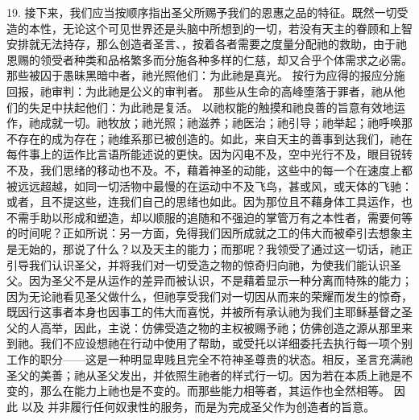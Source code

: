 19. 接下来，我们应当按顺序指出圣父所赐予我们的恩惠之品的特征。既然一切受造的本性，无论这个可见世界还是头脑中所想到的一切，若没有天主的眷顾和上智安排就无法持存，那么创造者圣言、，按着各者需要之度量分配祂的救助，由于祂恩赐的领受者种类和品格繁多而分施各种多样的仁慈，却又合乎个体需求之必需。那些被囚于愚昧黑暗中者，祂光照他们：为此祂是真光。 按行为应得的报应分施回报，祂审判：为此祂是公义的审判者。  那些从生命的高峰堕落于罪者，祂从他们的失足中扶起他们：为此祂是复活。 以祂权能的触摸和祂良善的旨意有效地运作，祂成就一切。祂牧放；祂光照；祂滋养；祂医治；祂引导；祂举起；祂呼唤那不存在的成为存在；祂维系那已被创造的。如此，来自天主的善事到达我们，祂在每件事上的运作比言语所能述说的更快。因为闪电不及，空中光行不及，眼目锐转不及，我们思绪的移动也不及。不，藉着神圣的动能，这些中的每一个在速度上都被远远超越，如同一切活物中最慢的在运动中不及飞鸟，甚或风，或天体的飞驰：或者，且不提这些，连我们自己的思绪也如此。因为那位且不藉身体工具运作，也不需手助以形成和塑造，却以顺服的追随和不强迫的掌管万有之本性者，需要何等的时间呢？正如所说：另一方面，免得我们因所成就之工的伟大而被牵引去想象主是无始的，那说了什么？以及天主的能力；而那呢？我领受了通过这一切话，祂正引导我们认识圣父，并将我们对一切受造之物的惊奇归向祂，为使我们能认识圣父。因为圣父不是从运作的差异而被认识，不是藉着显示一种分离而特殊的能力；因为无论祂看见圣父做什么，但祂享受我们对一切因从而来的荣耀而发生的惊奇，既因行这事者本身也因事工的伟大而喜悦，并被所有承认祂为我们主耶稣基督之圣父的人高举，因此，主说：仿佛受造之物的主权被赐予祂；仿佛创造之源从那里来到祂。我们不应设想祂在行动中使用了帮助，或受托以详细委托去执行每一项个别工作的职分——这是一种明显卑贱且完全不符神圣尊贵的状态。相反，圣言充满祂圣父的美善；祂从圣父发出，并依照生祂者的样式行一切。因为若在本质上祂是不变的，那么在能力上祂也是不变的。而那些能力相等者，其运作也全然相等。 因此 以及 并非履行任何奴隶性的服务，而是为完成圣父作为创造者的旨意。\par

